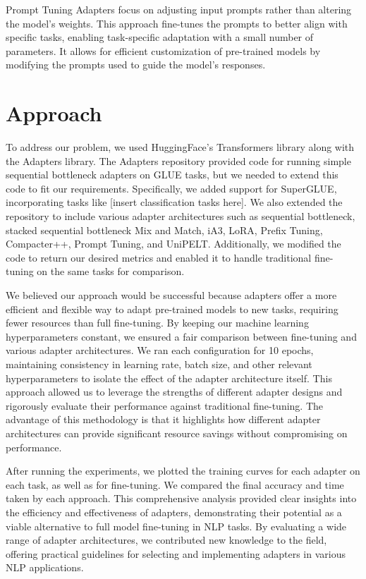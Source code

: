 \documentclass[10pt,twocolumn,letterpaper]{article}
\begin{document}
Prompt Tuning Adapters focus on adjusting input prompts rather than altering the model’s weights. This approach fine-tunes the prompts to better align with specific tasks, enabling task-specific adaptation with a small number of parameters. It allows for efficient customization of pre-trained models by modifying the prompts used to guide the model’s responses.
\section{Approach}
To address our problem, we used HuggingFace's Transformers library along with the Adapters library. The Adapters repository provided code for running simple sequential bottleneck adapters on GLUE tasks, but we needed to extend this code to fit our requirements. Specifically, we added support for SuperGLUE, incorporating tasks like [insert classification tasks here]. We also extended the repository to include various adapter architectures such as sequential bottleneck, stacked sequential bottleneck Mix and Match, iA3, LoRA, Prefix Tuning, Compacter++, Prompt Tuning, and UniPELT. Additionally, we modified the code to return our desired metrics and enabled it to handle traditional fine-tuning on the same tasks for comparison.

We believed our approach would be successful because adapters offer a more efficient and flexible way to adapt pre-trained models to new tasks, requiring fewer resources than full fine-tuning. By keeping our machine learning hyperparameters constant, we ensured a fair comparison between fine-tuning and various adapter architectures. We ran each configuration for 10 epochs, maintaining consistency in learning rate, batch size, and other relevant hyperparameters to isolate the effect of the adapter architecture itself. This approach allowed us to leverage the strengths of different adapter designs and rigorously evaluate their performance against traditional fine-tuning. The advantage of this methodology is that it highlights how different adapter architectures can provide significant resource savings without compromising on performance.

After running the experiments, we plotted the training curves for each adapter on each task, as well as for fine-tuning. We compared the final accuracy and time taken by each approach. This comprehensive analysis provided clear insights into the efficiency and effectiveness of adapters, demonstrating their potential as a viable alternative to full model fine-tuning in NLP tasks. By evaluating a wide range of adapter architectures, we contributed new knowledge to the field, offering practical guidelines for selecting and implementing adapters in various NLP applications.
\end{document}
